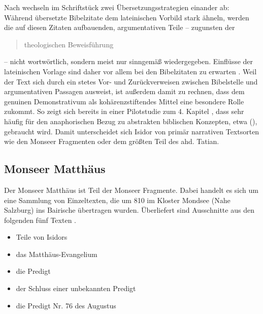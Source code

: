 
Nach \textcite{Matzel1970} wechseln im Schriftstück zwei Übersetzungsstrategien einander ab: Während übersetzte Bibelzitate dem lateinischen Vorbild stark ähneln, werden die auf diesen Zitaten aufbauenden, argumentativen Teile -- zugunsten der \blockcquote[357]{Matzel1970}{theologischen Beweisführung} -- nicht wortwörtlich, sondern meist nur sinngemäß wiedergegeben. Einflüsse der lateinischen Vorlage sind daher vor allem bei den Bibelzitaten zu erwarten \parencites()()[33]{Fleischer2006}[45f.]{Schlachter2012}. Weil der Text sich durch ein stetes Vor- und Zurückverweisen zwischen Bibelstelle und argumentativen Passagen ausweist, ist außerdem damit zu rechnen, dass dem genuinen Demonstrativum  als kohärenzstiftendes Mittel eine besondere Rolle zukommt. So zeigt sich bereits in einer Pilotstudie zum 4. Kapitel \parencite[s.][]{Szczepaniak2015}, dass  sehr häufig für den anaphorischen Bezug zu abstrakten biblischen Konzepten, etwa  (), gebraucht wird. Damit unterscheidet sich Isidor von primär narrativen Textsorten wie den Monseer Fragmenten oder dem größten Teil des ahd. Tatian.   


\subsection{Monseer Matthäus} \label{sec:monsee}

Der Monseer Matthäus ist Teil der Monseer Fragmente. Dabei handelt es sich um eine Sammlung von Einzeltexten, die um 810 im Kloster Mondsee (Nahe Salzburg) ins Bairische übertragen wurden. Überliefert sind Ausschnitte aus den folgenden fünf Texten \parencite{Krotz2003}.


\begin{itemize}
\item Teile von Isidors  
\item das Matthäus-Evangelium
\item die Predigt 
\item der Schluss einer unbekannten Predigt
\item die Predigt Nr. 76 des Augustus
\end{itemize}

